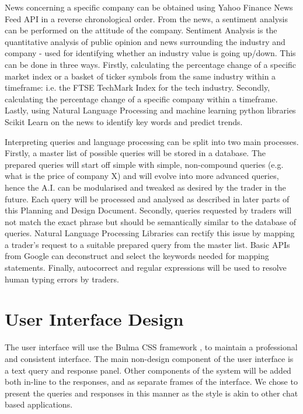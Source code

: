 \documentclass[]{IEEEtran}
\begin{document}
News concerning a specific company can be obtained using Yahoo Finance News Feed API in a reverse chronological order. From the news, a sentiment analysis can be performed on the attitude of the company. Sentiment Analysis is the quantitative analysis of public opinion and news surrounding the industry and company - used for identifying whether an industry value is going up/down. This can be done in three ways. Firstly, calculating the percentage change of a specific market index or a basket of ticker symbols from the same industry within a timeframe: i.e. the FTSE TechMark Index for the tech industry. Secondly, calculating the percentage change of a specific company within a timeframe. Lastly, using Natural Language Processing and machine learning python libraries Scikit Learn \cite{miks} on the news to identify key words and predict trends. 

Interpreting queries and language processing can be split into two main processes. Firstly, a master list of possible queries will be stored in a database. The prepared queries will start off simple with simple, non-compound queries (e.g. what is the price of company X) and will evolve into more advanced queries, hence the A.I. can be modularised and tweaked as desired by the trader in the future. Each query will be processed and analysed as described in later parts of this Planning and Design Document. Secondly, queries requested by traders will not match the exact phrase but should be semantically similar to the database of queries. Natural Language Processing Libraries \cite{spacy} \cite{tool} can rectify this issue by mapping a trader’s request to a suitable prepared query from the master list. Basic APIs from Google can deconstruct and select the keywords needed for mapping statements. Finally, autocorrect and regular expressions will be used to resolve human typing errors by traders.

\section{User Interface Design}

The user interface will use the Bulma CSS framework \cite{bulma}, to maintain a professional and consistent interface. The main non-design component of the user interface is a text query and response panel. Other components of the system will be added both in-line to the responses, and as separate frames of the interface. We chose to present the queries and responses in this manner as the style is akin to other chat based applications.
\end{document}
